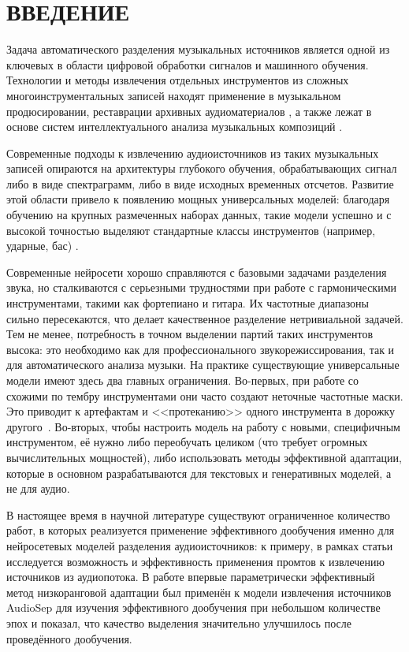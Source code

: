 \documentclass[14pt]{extarticle}
\begin{document}
\section*[ВВЕДЕНИЕ]{ВВЕДЕНИЕ}
Задача автоматического разделения музыкальных источников является одной из ключевых в области цифровой обработки 
сигналов и машинного обучения. Технологии и методы извлечения отдельных инструментов из сложных многоинструментальных 
записей находят применение в музыкальном продюсировании, реставрации архивных аудиоматериалов \cite{demucs}, а 
также лежат в основе систем интеллектуального анализа музыкальных композиций \cite{Spleeter, rus_speech_recogn}.

Современные подходы к извлечению аудиоисточников из таких музыкальных записей опираются на архитектуры
глубокого обучения, обрабатывающих сигнал либо в виде спектраграмм, либо в виде исходных временных отсчетов.
Развитие этой области привело к появлению мощных универсальных моделей: благодаря обучению на крупных размеченных 
наборах данных, такие модели успешно и с высокой точностью выделяют стандартные классы инструментов (например, ударные, бас) 
\cite{demucs}.

Современные нейросети хорошо справляются с базовыми задачами разделения звука, но сталкиваются с 
серьезными трудностями при работе с гармоническими инструментами, такими как фортепиано и гитара. 
Их частотные диапазоны сильно пересекаются, что делает качественное разделение нетривиальной задачей.
Тем не менее, потребность в точном выделении партий таких инструментов высока: это необходимо как для 
профессионального звукорежиссирования, так и для автоматического анализа музыки. 
На практике существующие универсальные модели имеют здесь два главных ограничения.
Во-первых, при работе со схожими по тембру инструментами они часто создают неточные частотные маски. 
Это приводит к артефактам и <<протеканию>> одного инструмента в дорожку другого~\cite{metrics}.
Во-вторых, чтобы настроить модель на работу с новыми, специфичным инструментом, её нужно либо переобучать целиком
(что требует огромных вычислительных мощностей), либо использовать методы эффективной адаптации, которые
в основном разрабатываются для текстовых и генеративных моделей, а не для аудио.

В настоящее время в научной литературе существуют ограниченное количество работ, в которых реализуется применение
эффективного дообучения именно для нейросетевых моделей разделения аудиоисточников: к примеру,
в рамках статьи~\cite{audio_prompt} исследуется возможность и эффективность применения  промтов к 
извлечению источников из аудиопотока. В работе \cite{mag_lora} впервые параметрически эффективный метод низкоранговой 
адаптации \cite{LoRA} был применён к модели извлечения источников AudioSep для изучения
эффективного дообучения при небольшом количестве эпох и показал, что качество выделения значительно улучшилось после
проведённого дообучения.
\end{document}
